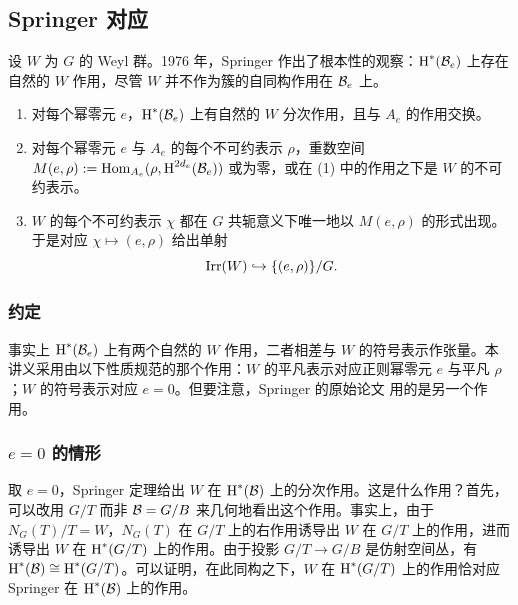\subsection{Springer 对应}\label{ss:Spr corr} 设 $W$ 为 $G$ 的 Weyl 群。1976 年，Springer \cite{Springer} 作出了根本性的观察：$\textup{H}^{*}({\mathcal{B}_{e}})$ 上存在自然的 $W$ 作用，尽管 $W$ 并不作为簇的自同构作用在 $\mathcal{B}_{e}$ 上。

\begin{theorem}\label{th:Spr corr}
\begin{enumerate}
\item 对每个幂零元 $e$，$\textup{H}^{*}({\mathcal{B}_{e}})$ 上有自然的 $W$ 分次作用，且与 $A_{e}$ 的作用交换。
\item 对每个幂零元 $e$ 与 $A_{e}$ 的每个不可约表示 $\rho$，重数空间 $M(e,\rho):=\textup{Hom}_{A_{e}}(\rho, \textup{H}^{2d_{e}}({\mathcal{B}_{e}}))$ 或为零，或在 (1) 中的作用之下是 $W$ 的不可约表示。
\item $W$ 的每个不可约表示 $\chi$ 都在 $G$ 共轭意义下唯一地以 $M(e,\rho)$ 的形式出现。于是对应 $\chi\mapsto (e,\rho)$ 给出单射
\begin{equation}\label{Spr corr}
\textup{Irr}(W)\hookrightarrow \{(e,\rho)\}/G.
\end{equation}
\end{enumerate}
\end{theorem}

\subsubsection{约定}\label{sss:two actions} 事实上 $\textup{H}^{*}({\mathcal{B}_{e}})$ 上有两个自然的 $W$ 作用，二者相差与 $W$ 的符号表示作张量。本讲义采用由以下性质规范的那个作用：$W$ 的平凡表示对应正则幂零元 $e$ 与平凡 $\rho$；$W$ 的符号表示对应 $e=0$。但要注意，Springer 的原始论文 \cite{Springer} 用的是另一个作用。

\subsubsection{$e=0$ 的情形} 取 $e=0$，Springer 定理给出 $W$ 在 $\textup{H}^{*}({\mathcal{B}})$ 上的分次作用。这是什么作用？首先，可以改用 $G/T$ 而非 $\mathcal{B}=G/B$ 来几何地看出这个作用。事实上，由于 $N_{G}(T)/T=W$，$N_{G}(T)$ 在 $G/T$ 上的右作用诱导出 $W$ 在 $G/T$ 上的作用，进而诱导出 $W$ 在 $\textup{H}^{*}({G/T})$ 上的作用。由于投影 $G/T\to G/B$ 是仿射空间丛，有 $\textup{H}^{*}({\mathcal{B}})\cong\textup{H}^{*}({G/T})$。可以证明，在此同构之下，$W$ 在 $\textup{H}^{*}({G/T})$ 上的作用恰对应 Springer 在 $\textup{H}^{*}({\mathcal{B}})$ 上的作用。

